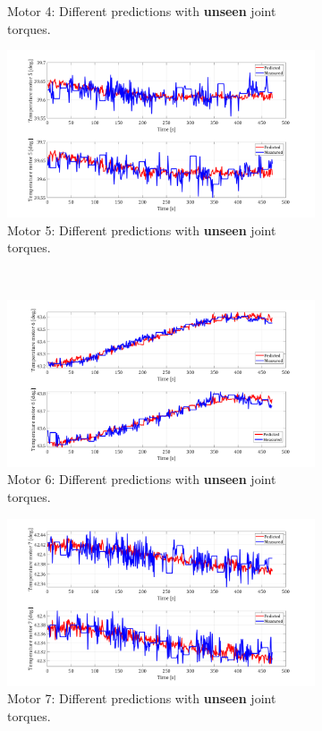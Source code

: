 \documentclass{ifacconf}
\begin{document}
\begin{figure}[t!]
\begin{subfigure}[t]{\columnwidth}
	\caption{Motor 4: Different predictions with \textbf{unseen} joint torques.}
\end{subfigure}
	\begin{subfigure}[t]{\columnwidth}
	\includegraphics[height=2.in]{./pictures/applications/J5o.png}
	\caption{Motor 5: Different predictions with \textbf{unseen} joint torques.}
\end{subfigure}%
~ 
\begin{subfigure}[t]{\columnwidth}
	\includegraphics[height=2.in]{./pictures/applications/J6o.png}
	\caption{Motor 6: Different predictions with \textbf{unseen} joint torques.}
\end{subfigure}
\begin{subfigure}[t]{\columnwidth}
	\includegraphics[height=2.in]{./pictures/applications/J7o.png}
	\caption{Motor 7: Different predictions with \textbf{unseen} joint torques.}
\end{subfigure}
~
\begin{subfigure}[t]{\columnwidth}

\end{subfigure}
\end{figure}
\end{document}
